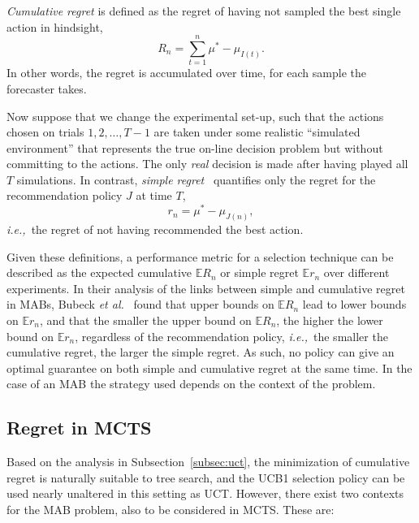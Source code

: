\documentclass[a4paper]{llncs}
\newcommand{\ie}{{\it i.e.,}~}
\newcommand{\bE}{\mathbb{E}}
\begin{document}
\emph{Cumulative regret} is defined as the regret of having not sampled the best single action in hindsight, 
\begin{equation}
R_n = \sum_{t = 1}^{n}{\mu^* - \mu_{I(t)}}.
\end{equation}
In other words, the regret is accumulated over time, for each sample the forecaster takes.

Now suppose that we change the experimental set-up, such that the actions chosen on trials $1, 2, \ldots, T-1$ are taken under some realistic ``simulated environment'' that represents the true on-line decision problem but without committing to the actions. The only \emph{real} decision is made after having played all $T$ simulations. In contrast, \emph{simple regret}~\cite{Bubeck11Pure} quantifies only the regret for the recommendation policy $J$ at time $T$,
\begin{equation}
r_n = \mu^* - \mu_{J(n)},
\end{equation}
\ie the regret of not having recommended the best action.

Given these definitions, a performance metric for a selection technique can be described as the expected cumulative $\bE R_n$ or simple regret $\bE r_n$ over different experiments. In their analysis of the links between simple and cumulative regret in MABs, Bubeck \emph{et al.}~\cite{Bubeck11Pure} found that upper bounds on $\bE R_n$ lead to lower bounds on $\bE r_n$, and that the smaller the upper bound on $\bE R_n$, the higher the lower bound on $\bE r_n$, regardless of the recommendation policy, \ie the smaller the cumulative regret, the larger the simple regret. As such, no policy can give an optimal guarantee on both simple and cumulative regret at the same time. In the case of an MAB the strategy used depends on the context of the problem.

\subsection{Regret in MCTS}
\label{subsec:reg_mcts}

Based on the analysis in Subsection~\ref{subsec:uct}, the minimization of cumulative regret is naturally suitable to tree search, and the UCB1 selection policy can be used nearly unaltered in this setting as UCT. However, there exist two contexts for the MAB problem, also to be considered in MCTS. These are:
\end{document}

